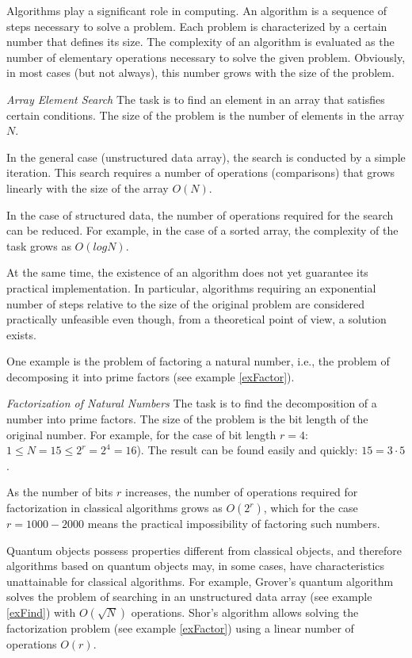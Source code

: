 Algorithms play a significant role in computing. An algorithm is a sequence of steps necessary to solve a problem. Each problem is characterized by a certain number that defines its size. The complexity of an algorithm is evaluated as the number of elementary operations necessary to solve the given problem. Obviously, in most cases (but not always), this number grows with the size of the problem.

\begin{example}
\emph{Array Element Search}
\label{exFind}
The task is to find an element in an array that satisfies certain conditions. The size of the problem is the number of elements in the array $N$.

In the general case (unstructured data array), the search is conducted by a simple iteration. This search requires a number of operations (comparisons) that grows linearly with the size of the array $O\left( N \right)$.

In the case of structured data, the number of operations required for the search can be reduced. For example, in the case of a sorted array, the complexity of the task grows as $O\left(log N\right)$.
\end{example}

At the same time, the existence of an algorithm does not yet guarantee its practical implementation. In particular, algorithms requiring an exponential number of steps relative to the size of the original problem are considered practically unfeasible even though, from a theoretical point of view, a solution exists.

One example is the problem of factoring a natural number, i.e., the problem of decomposing it into prime factors (see example \ref{exFactor}).

\begin{example}
\emph{Factorization of Natural Numbers}
\label{exFactor}
The task is to find the decomposition of a number into prime factors. The size of the problem is the bit length of the original number. For example, for the case of bit length $r = 4$: $1 \le N = 15 \le 2^r = 2^4 = 16$). The result can be found easily and quickly: $15 = 3 \cdot 5$.

As the number of bits $r$ increases, the number of operations required for factorization in classical algorithms grows as $O\left(2^r\right)$, which for the case $r = 1000 - 2000$ means the practical impossibility of factoring such numbers.
\end{example}

Quantum objects possess properties different from classical objects, and therefore algorithms based on quantum objects may, in some cases, have characteristics unattainable for classical algorithms. For example, Grover's quantum algorithm \cite{Grover96afast} solves the problem of searching in an unstructured data array (see example \ref{exFind}) with $O\left(\sqrt{N}\right)$ operations. Shor's algorithm \cite{bShor94} allows solving the factorization problem (see example \ref{exFactor}) using a linear number of operations $O\left(r\right)$.
